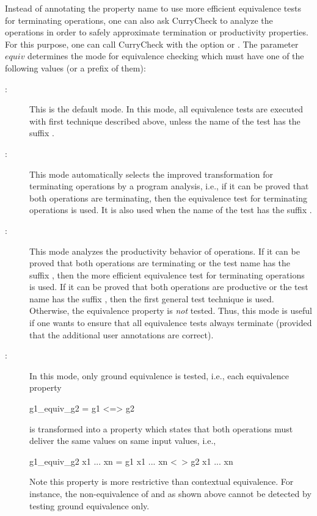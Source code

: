 Instead of annotating the property name to use more efficient equivalence
tests for terminating operations, one can also ask CurryCheck
to analyze the operations in order to safely approximate
termination or productivity properties.
For this purpose, one can call CurryCheck with the option
 or .
The parameter $equiv$ determines the mode for equivalence checking
which must have one of the following values (or a prefix of them):
%
\begin{description}
\item[:]
This is the default mode. In this mode, all equivalence tests
are executed with first technique described above, unless
the name of the test has the suffix .
\item[:]
This mode automatically selects the improved transformation
for terminating operations by a program analysis, i.e.,
if it can be proved that both operations are terminating, then
the equivalence test for terminating operations is used.
It is also used when the name of the test has the suffix .
\item[:]
This mode analyzes the productivity behavior of operations.
If it can be proved that both operations are terminating
or the test name has the suffix , then
the more efficient equivalence test for terminating operations is used.
If it can be proved that both operations are productive
or the test name has the suffix , then
the first general test technique is used.
Otherwise, the equivalence property is \emph{not} tested.
Thus, this mode is useful if one wants to ensure that all
equivalence tests always terminate (provided that the additional
user annotations are correct).
\item[:]
In this mode, only ground equivalence is tested, i.e.,
each equivalence property
\begin{curry}
g1_equiv_g2 = g1 <=> g2
\end{curry}
is transformed into a property which states that both
operations must deliver the same values on same input values, i.e.,
\begin{curry}
g1_equiv_g2 x1 ... xn = g1 x1 ... xn <~> g2 x1 ... xn
\end{curry}
Note this property is more restrictive than contextual equivalence.
For instance, the non-equivalence of  and 
as shown above cannot be detected by testing ground equivalence only.
\end{description}


